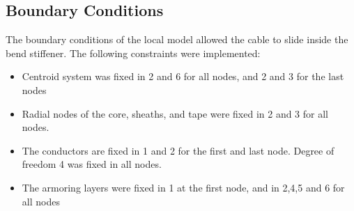 \subsection{Boundary Conditions}
The boundary conditions of the local model allowed the cable to slide inside the bend stiffener. The following constraints were implemented:
\begin{itemize}
    \item Centroid system was fixed in 2 and 6 for all nodes, and 2 and 3 for the last nodes
    \item Radial nodes of the core, sheaths, and tape were fixed in 2 and 3 for all nodes. 
    \item The conductors are fixed in 1 and 2 for the first and last node. Degree of freedom 4 was fixed in all nodes.
    \item The armoring layers were fixed in 1 at the first node, and in 2,4,5 and 6 for all nodes
\end{itemize}

